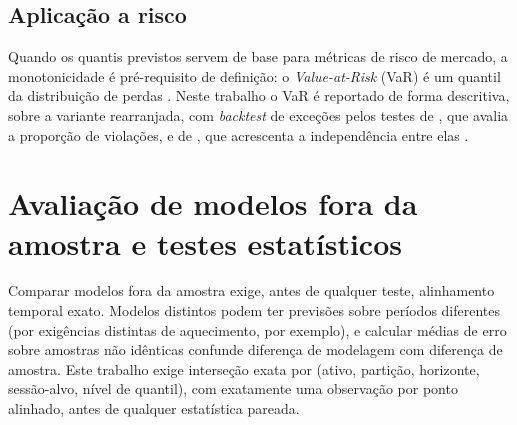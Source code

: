 \subsection{Aplicação a risco}
Quando os quantis previstos servem de base para métricas de risco de mercado, a monotonicidade é pré-requisito de definição: o \textit{Value-at-Risk} (VaR) é um quantil da distribuição de perdas \cite[Def.~2.2]{ACERBI2002}. Neste trabalho o VaR é reportado de forma descritiva, sobre a variante rearranjada, com \textit{backtest} de exceções pelos testes de , que avalia a proporção de violações, e de , que acrescenta a independência entre elas \cite{CHRISTOFFERSENPELLETIER2004}.

\section{Avaliação de modelos fora da amostra e testes estatísticos}
Comparar modelos fora da amostra exige, antes de qualquer teste, alinhamento temporal exato. Modelos distintos podem ter previsões sobre períodos diferentes (por exigências distintas de aquecimento, por exemplo), e calcular médias de erro sobre amostras não idênticas confunde diferença de modelagem com diferença de amostra. Este trabalho exige interseção exata por (ativo, partição, horizonte, sessão-alvo, nível de quantil), com exatamente uma observação por ponto alinhado, antes de qualquer estatística pareada.

